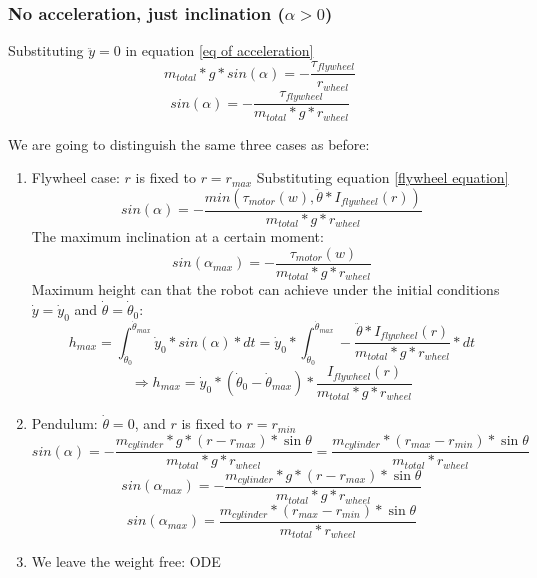 \subsubsection{No acceleration, just inclination ($\alpha > 0$)}
Substituting $\ddot{y}=0$ in equation \ref{eq of acceleration}
\[m_{total} * g * sin(\alpha) = - \frac{\tau_{flywheel}}{r_{wheel}} \]
\[sin(\alpha) = - \frac{\tau_{flywheel}}{m_{total} * g * r_{wheel}} \]

We are going to distinguish the same three cases as before:
\begin{enumerate}
    \item Flywheel case: $r$ is fixed to $r = r_{max}$
    Substituting equation \ref{flywheel equation}
    \[sin(\alpha) = - \frac{min(\tau_{motor} (w), \ddot{\theta}*I_{flywheel}(r))}{m_{total} * g * r_{wheel}} \]
    The maximum inclination at a certain moment:
    \[sin(\alpha_{max}) = - \frac{\tau_{motor} (w)}{m_{total} * g * r_{wheel}} \]
    Maximum height can that the robot can achieve under the initial conditions $\dot{y}=\dot{y}_0$ and $\dot{\theta}=\dot{\theta}_0$:
    \[h_{max}=\int_{\dot{\theta}_0}^{\dot{\theta}_{max}} \dot{y}_0*sin(\alpha) * dt  = \dot{y}_0* \int_{\dot{\theta}_0}^{\dot{\theta}_{max}} - \frac{\ddot{\theta}*I_{flywheel}(r)}{m_{total} * g * r_{wheel}} * dt\]
    \[\boxed{\Rightarrow h_{max}= \dot{y}_0* (\dot{\theta}_0-\dot{\theta}_{max}) * \frac{I_{flywheel}(r)}{m_{total} * g * r_{wheel}}}\]

    \item Pendulum: $\dot{\theta} = 0$, and $r$ is fixed to $r = r_{min}$
    \[sin(\alpha) = - \frac{m_{cylinder} * g * (r - r_{max}) * \sin{\theta}}{m_{total} * g * r_{wheel}} = \frac{m_{cylinder} * (r_{max}- r_{min}) * \sin{\theta}}{m_{total} * r_{wheel}} \]
    \[sin(\alpha_{max}) = - \frac{m_{cylinder} * g * (r - r_{max}) * \sin{\theta}}{m_{total} * g * r_{wheel}}\]
    \[\boxed{sin(\alpha_{max}) = \frac{m_{cylinder} * (r_{max}- r_{min}) * \sin{\theta}}{m_{total} * r_{wheel}}} \]
    
    \item We leave the weight free:
    ODE

\end{enumerate}
